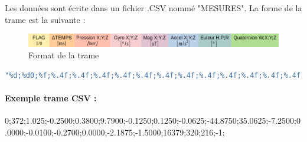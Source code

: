{	Les données sont écrite dans un fichier .CSV nommé "MESURES". La forme de la trame est la suivante :
	
	\begin{figure}[h]
		\centering
		\includegraphics[width=1.1\textwidth]{Figures/Dev-SOFT/Trame}
		\caption{Format de la trame}
		\label{fig:trame}
	\end{figure}

	\begin{lstlisting}[frame=single, language=C, caption={Ecriture du buffer}, captionpos=b, breaklines=true]
"%d;%d0;%f;%.4f;%.4f;%.4f;%.4f;%.4f;%.4f;%.4f;%.4f;%.4f;%.4f;%.4f;%.4f;%.4f;%.4f;%.4f;%d;%d;%d;%d;"
	\end{lstlisting}
	
	\paragraph{Exemple trame CSV :} 
	0;372;1.025;-0.2500;0.3800;9.7900;-0.1250;0.1250;-0.0625;-44.8750;35.0625;-7.2500;0.0000;-0.0100;-0.2700;0.0000;-2.1875;-1.5000;16379;320;216;-1;

		
	\clearpage
	

}
